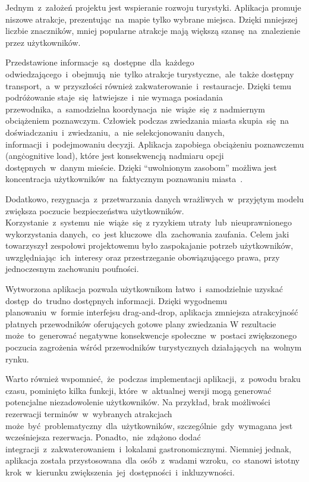 \indent Jednym~z~założeń projektu jest wspieranie rozwoju turystyki.
Aplikacja promuje niszowe atrakcje, prezentując~na~mapie tylko wybrane miejsca.
Dzięki mniejszej liczbie znaczników, mniej popularne atrakcje mają większą szansę~na~znalezienie przez użytkowników.

\indent Przedstawione informacje~są~dostępne~dla~każdego odwiedzającego~i~obejmują~nie~tylko atrakcje turystyczne,~ale~także dostępny transport,~a~w przyszłości również zakwaterowanie~i~restauracje.
Dzięki temu podróżowanie staje~się~łatwiejsze~i~nie wymaga posiadania przewodnika,~a~samodzielna koordynacja~nie~wiąże~się~z nadmiernym obciążeniem poznawczym.
Człowiek podczas zwiedzania miasta skupia~się~na doświadczaniu~i~zwiedzaniu,~a~nie selekcjonowaniu danych, informacji~i~podejmowaniu decyzji.
Aplikacja zapobiega obciążeniu poznawczemu (ang\. cognitive load), które jest konsekwencją nadmiaru opcji dostępnych~w~danym mieście.
Dzięki ``uwolnionym zasobom'' możliwa jest koncentracja użytkowników~na~faktycznym poznawaniu miasta~\cite{cognitive-biases}.

\indent Dodatkowo, rezygnacja~z~przetwarzania danych wrażliwych~w~przyjętym modelu zwiększa poczucie bezpieczeństwa użytkowników.
Korzystanie~z~systemu~nie~wiąże~się~z ryzykiem utraty~lub~nieuprawnionego wykorzystania danych,~co~jest kluczowe~dla~zachowania zaufania.
Celem jaki towarzyszył zespołowi projektowemu było zaspokajanie potrzeb użytkowników, uwzględniając~ich~interesy oraz przestrzeganie obowiązującego prawa, przy jednoczesnym zachowaniu poufności.

\indent Wytworzona aplikacja pozwala użytkownikom łatwo~i~samodzielnie uzyskać dostęp~do~trudno dostępnych informacji.
Dzięki wygodnemu planowaniu~w~formie interfejsu drag-and-drop, aplikacja zmniejsza atrakcyjność płatnych przewodników oferujących gotowe plany zwiedzania
W rezultacie może~to~generować negatywne konsekwencje społeczne~w~postaci zwiększonego poczucia zagrożenia wśród przewodników turystycznych działających~na~wolnym rynku.

\indent Warto również wspomnieć,~że~podczas implementacji aplikacji,~z~powodu braku czasu, pominięto kilka funkcji, które~w~aktualnej wersji mogą generować potencjalne niezadowolenie użytkowników.
Na przykład, brak możliwości rezerwacji terminów~w~wybranych atrakcjach może~być~problematyczny~dla~użytkowników, szczególnie~gdy~wymagana jest wcześniejsza rezerwacja.
Ponadto,~nie~zdążono dodać integracji~z~zakwaterowaniem~i~lokalami gastronomicznymi.
Niemniej jednak, aplikacja została przystosowana~dla~osób~z~wadami wzroku,~co~stanowi istotny krok~w~kierunku zwiększenia~jej~dostępności~i~inkluzywności.

